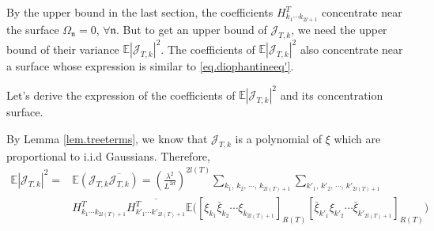  By the upper bound in the last section, the coefficients $H^T_{k_1\cdots k_{2l+1}}$ concentrate near the surface $\Omega_{\mathfrak{n}}=0$, $\forall \mathfrak{n}$. But to get an upper bound of $\mathcal{J}_{T,k}$, we need the upper bound of their variance $\mathbb{E}|\mathcal{J}_{T,k}|^2$. The coefficients of $\mathbb{E}|\mathcal{J}_{T,k}|^2$ also concentrate near a surface whose expression is similar to \eqref{eq.diophantineeq'}. 
 
 Let's derive the expression of the coefficients of $\mathbb{E}|\mathcal{J}_{T,k}|^2$ and its concentration surface.
 
 
 
 By Lemma \ref{lem.treeterms}, we know that $\mathcal{J}_{T,k}$ is a polynomial of $\xi$ which are proportional to i.i.d Gaussians. Therefore, 
 \begin{equation}\label{eq.termexp1}
 \begin{split}
  \mathbb{E}|\mathcal{J}_{T,k}|^2=&\mathbb{E}(\mathcal{J}_{T,k}\overline{\mathcal{J}_{T,k}})=\left(\frac{\lambda^2}{L^{2d}}\right)^{2l(T)}
  \sum_{k_1,\, k_2,\, \cdots,\, k_{2l(T)+1}}\sum_{k'_1,\, k'_2,\, \cdots,\, k'_{2l(T)+1}}
  \\[0.5em]
  & H^T_{k_1\cdots k_{2l(T)+1}} \overline{H^{T}_{k'_1\cdots k'_{2l(T)+1}}} \mathbb{E}\Big([\xi_{k_1}\bar{\xi}_{k_2}\cdots\xi_{k_{2l(T)+1}}]_{R(T)}
  [\bar{\xi}_{k'_1}\xi_{k'_2}\cdots\bar{\xi}_{k'_{2l(T)+1}}]_{R(T)}\Big)
 \end{split}
 \end{equation}
 
